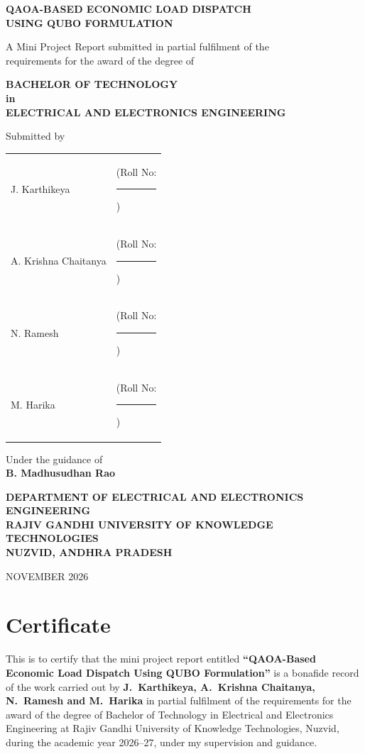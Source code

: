\begin{titlepage}
\centering
{\Large\bfseries QAOA-BASED ECONOMIC LOAD DISPATCH\\[4pt] USING QUBO FORMULATION\par}
\vspace{0.8cm}
{\large A Mini Project Report submitted in partial fulfilment of the\\ requirements for the award of the degree of\par}
\vspace{0.4cm}
{\large\bfseries BACHELOR OF TECHNOLOGY\\ in\\ ELECTRICAL AND ELECTRONICS ENGINEERING\par}
\vspace{0.8cm}
{\large Submitted by\par}
\vspace{0.3cm}
\begin{tabular}{ll}
J. Karthikeya & (Roll No: \rule{3cm}{0.4pt})\\
A. Krishna Chaitanya & (Roll No: \rule{3cm}{0.4pt})\\
N. Ramesh & (Roll No: \rule{3cm}{0.4pt})\\
M. Harika & (Roll No: \rule{3cm}{0.4pt})\\
\end{tabular}
\vspace{0.8cm}

{\large Under the guidance of\\[4pt] \bfseries B. Madhusudhan Rao\par}
\vfill
{\large\bfseries DEPARTMENT OF ELECTRICAL AND ELECTRONICS ENGINEERING\\
RAJIV GANDHI UNIVERSITY OF KNOWLEDGE TECHNOLOGIES\\
NUZVID, ANDHRA PRADESH\par}
\vspace{0.3cm}
{\large NOVEMBER 2026\par}
\end{titlepage}

\chapter*{Certificate}
This is to certify that the mini project report entitled \textbf{``QAOA-Based Economic Load Dispatch Using QUBO Formulation''} is a bonafide record of the work carried out by \textbf{J.~Karthikeya, A.~Krishna Chaitanya, N.~Ramesh and M.~Harika} in partial fulfilment of the requirements for the award of the degree of Bachelor of Technology in Electrical and Electronics Engineering at Rajiv Gandhi University of Knowledge Technologies, Nuzvid, during the academic year 2026--27, under my supervision and guidance.

